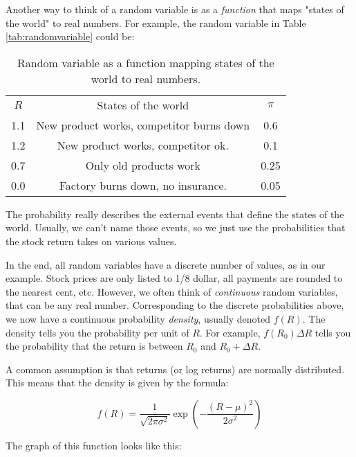 Another way to think of a random variable is as a
\textit{function} that maps "states of the world" to
real numbers. For example, the random variable in 
Table \ref{tab:randomvariable} could be:

\begin{table}[!htbp]
    \centering
    \begin{tabular}{c c c}
        $R$ & States of the world & $\pi$ \\
        1.1 & New product works, competitor burns down & 0.6 \\
        1.2 & New product works, competitor ok. & 0.1 \\
        0.7 & Only old products work & 0.25 \\
        0.0 & Factory burns down, no insurance. & 0.05 \\
    \end{tabular}
    \caption{Random variable as a function mapping states of the world to real numbers.}
    \label{tab:statesoftheworld}
\end{table}

The probability really describes the external events 
that define the states of the world. Usually, we 
can't name those events, so we just use the probabilities
that the stock return takes on various values.

In the end, all random variables have a discrete number of values,
as in our example. Stock prices are only listed to 
1/8 dollar, all payments are rounded to the nearest cent, etc.
However, we often think of \textit{continuous} random variables,
that can be any real number. 
Corresponding to the discrete probabilities above,
we now have a continuous probability \textit{density},
usually denoted $f(R)$. 
The density tells you the probability per unit of $R$.
For example, $f(R_0)\Delta R$ tells you the probability
that the return is between $R_0$ and $R_0 + \Delta R$.

A common assumption is that returns (or log returns) are 
normally distributed. This means that the density is
given by the formula:

\begin{equation}
    f(R) = \frac{1}{\sqrt{2\pi\sigma^2}}\exp\left(-\frac{(R-\mu)^2}{2\sigma^2}\right)
\end{equation}

The graph of this function looks like this:

